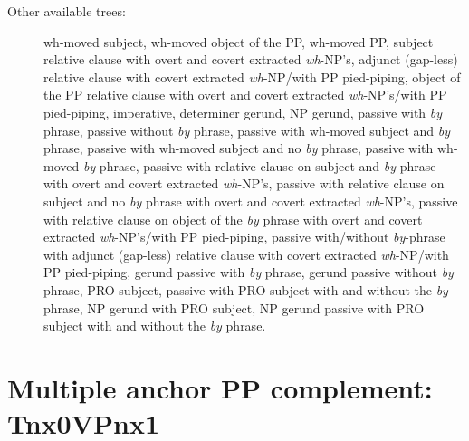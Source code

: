 \begin{description}
\item[Other available trees:] wh-moved subject, wh-moved object of the PP,
wh-moved PP, subject relative clause with overt and covert extracted {\it
wh}-NP's, adjunct (gap-less) relative clause with covert extracted {\it
wh}-NP/with PP pied-piping, object of the PP relative clause with overt and
covert extracted {\it wh}-NP's/with PP pied-piping, imperative, determiner
gerund, NP gerund, passive with {\it by} phrase, passive without {\it by}
phrase, passive with wh-moved subject and {\it by} phrase, passive with
wh-moved subject and no {\it by} phrase, passive with wh-moved {\it by}
phrase, passive with relative clause on subject and {\it by} phrase with
overt and covert extracted {\it wh}-NP's, passive with relative clause on
subject and no {\it by} phrase with overt and covert extracted {\it
wh}-NP's, passive with relative clause on object of the {\it by} phrase
with overt and covert extracted {\it wh}-NP's/with PP pied-piping, passive
with/without {\it by}-phrase with adjunct (gap-less) relative clause with
covert extracted {\it wh}-NP/with PP pied-piping, gerund passive with {\it
by} phrase, gerund passive without {\it by} phrase, PRO subject, passive
with PRO subject with and without the {\it by} phrase, NP gerund with PRO
subject, NP gerund passive with PRO subject with and without the {\it by}
phrase.

\end{description}

\section{Multiple anchor PP complement: Tnx0VPnx1}\label{verbs,prepositional complement} 
\label{nx0VPnx1-family}

